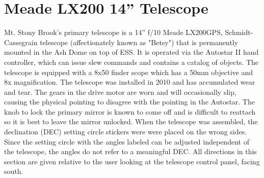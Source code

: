 \documentclass[12pt,titlepage]{article}
\begin{document}
\section{Meade LX200 14'' Telescope}
Mt. Stony Brook's primary telescope is a 14'' f/10 Meade LX200GPS, Schmidt-Cassegrain telescope (affectionately known as "Betsy") that is permanently mounted in the Ash Dome on top of ESS.
It is operated via the Autostar II hand controller, which can issue slew commands and contains a catalog of objects.
The telescope is equipped with a 8x50 finder scope which has a 50mm objective and 8x magnification.
The telescope was installed in 2010 and has accumulated wear and tear.
The gears in the drive motor are worn and will occasionally slip, causing the physical pointing to disagree with the pointing in the Autostar.
The knob to lock the primary mirror is known to come off and is difficult to reattach so it is best to leave the mirror unlocked. When the telescope was assembled, the declination (DEC) setting circle stickers were were placed on the wrong sides. Since the setting circle with the angles labeled can be adjusted independent of the telescope, the angles do not refer to a meaningful DEC.
All directions in this section are given relative to the user looking at the telescope control panel, facing south.
\end{document}

